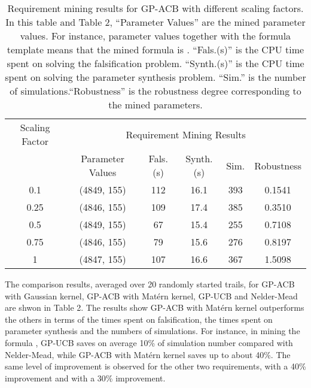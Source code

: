 \documentclass[10pt]{article}
\theoremstyle{plain}
\begin{document}
\begin{table}[!htb]
\centering  
\label{scale factor}
\caption{Requirement mining results for GP-ACB with different scaling factors. In this table and Table 2, ``Parameter Values'' are the mined parameter values. For instance, parameter values  together with the formula template  means that the mined formula is . ``Fals.(s)'' is the CPU time spent on solving the falsification problem. ``Synth.(s)'' is the CPU time spent on solving the parameter synthesis problem. ``Sim.'' is the number of simulations.``Robustness'' is the robustness degree corresponding to the mined parameters.}
\begin{tabular}{c|ccccc}   
\hline
Scaling Factor &\multicolumn{5}{c}{Requirement Mining Results}\\     
 &Parameter Values  &Fals.(s)  &Synth.(s)  &Sim.  &Robustness\\ 
\hline  0.1   &(4849, 155) &112	&16.1	&393	&0.1541\\   
0.25  &(4846, 155)&109	&17.4	&385	&0.3510\\          
0.5   &(4849, 155)&67	&15.4	&255	&0.7108\\       
0.75  &(4846, 155)&79	&15.6	&276	&0.8197\\      
1     &(4847, 155)&107	&16.6	&367	&1.5098\\
\hline
\end{tabular}
\end{table}

The comparison results, averaged over 20 randomly started trails, for GP-ACB with Gaussian kernel, GP-ACB with Mat\'{e}rn kernel, GP-UCB and Nelder-Mead are shwon in Table 2. The results show GP-ACB with Mat\'{e}rn kernel outperforms the others in terms of the times spent on falsification, the times spent on parameter synthesis and the numbers of simulations. For instance, in mining the formula , GP-UCB saves on average 10\% of simulation number compared with Nelder-Mead, while GP-ACB with Mat\'{e}rn kernel saves up to about 40\%. The same level of improvement is observed for the other two requirements,  with a 40\% improvement and  with a 30\% improvement.
\end{document}
